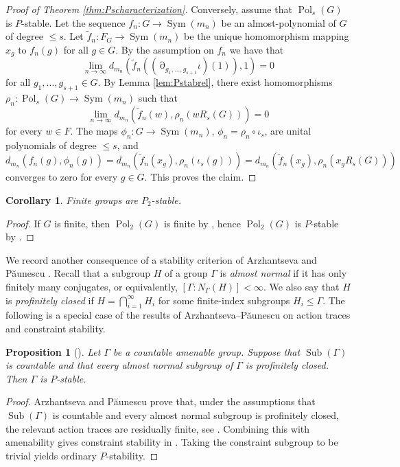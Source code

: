 \documentclass[a4paper,12pt]{amsart}
\theoremstyle{plain}
\newtheorem{corollary}[subsection]{{\bf Corollary}}
\newtheorem{proposition}[subsection]{{\bf Proposition}}
\theoremstyle{definition}
\theoremstyle{remark}
\numberwithin{equation}{subsection}
\DeclareMathOperator{\Sym}{Sym}
\DeclareMathOperator{\Sub}{Sub}
\DeclareMathOperator{\Pold}{Pol}
\DeclareMathOperator{\mypartial}{\partial}
\begin{document}
\begin{proof}[Proof of Theorem \ref{thm:Pscharacterization}]
Conversely, assume that $\Pold_s(G)$ is $P$-stable. Let the sequence $f_n:G\to\Sym(m_n)$ be an almost-polynomial of $G$ of degree $\le s$. Let $\widetilde{f}_n:F_G\to\Sym(m_n)$ be the unique homomorphism mapping $x_g$ to $f_n(g)$ for all $g\in G$. By the assumption on $f_n$ we have that
$$\lim_{n\to\infty} d_{m_n}(\widetilde{f}_n((\mypartial_{g_1,\ldots ,g_{s+1}}\iota)(1)),1)=0$$
for all $g_1,\ldots ,g_{s+1}\in G$. By Lemma \ref{lem:Pstabrel}, there exist homomorphisms $\rho_n:\Pold_s(G)\to\Sym(m_n)$ such that
$$\lim_{n\to\infty}d_{m_n}(\widetilde{f}_n(w),\rho_n(wR_s(G)))=0$$
for every $w\in F$. The maps $\phi_n:G\to\Sym(m_n)$, $\phi_n=\rho_n\circ\iota_s$, are unital polynomials of degree $\le s$, and
$$d_{m_n}(f_n(g),\phi_n(g))=d_{m_n}(\widetilde{f}_n(x_g),\rho_n(\iota_s(g)))=
d_{m_n}(\widetilde{f}_n(x_g),\rho_n(x_gR_s(G)))$$
converges to zero for every $g\in G$. This proves the claim.
\end{proof}

\begin{corollary}
    \label{cor:finiteP2}
    Finite groups are $P_2$-stable.
\end{corollary}

\begin{proof}
    If $G$ is finite, then $\Pold_2(G)$ is finite by \cite[Corollary 4.4]{JT24}, hence $\Pold_2(G)$ is $P$-stable by \cite{GR09}.
\end{proof}

We record another consequence of a stability criterion of Arzhantseva and
P\u{a}unescu \cite{AP24}. Recall that a subgroup $H$ of a group $\Gamma$ is
\emph{almost normal} if it has only finitely many conjugates, or
equivalently,
$[\Gamma:N_\Gamma(H)]<\infty$.
We also say that $H$ is \emph{profinitely closed} if
$H=\bigcap_{i=1}^{\infty} H_i$
for some finite-index subgroups $H_i\leq \Gamma$.
The following is a special case of the results of
Arzhantseva--P\u{a}unescu on action traces and constraint stability.

\begin{proposition}[\cite{AP24}]
\label{prop:AP-criterion}
Let $\Gamma$ be a countable amenable group.  Suppose that
$\Sub(\Gamma)$ is countable and that every almost normal subgroup of
$\Gamma$ is profinitely closed.  Then $\Gamma$ is $P$-stable.
\end{proposition}

\begin{proof}
Arzhantseva and P\u{a}unescu prove that, under the assumptions that
$\Sub(\Gamma)$ is countable and every almost normal subgroup is
profinitely closed, the relevant action traces are residually finite,
see \cite[Proposition 5.17]{AP24}.  Combining this with amenability
gives constraint stability in
\cite[Corollary~ 5.19]{AP24}.  Taking the constraint subgroup to be
trivial yields ordinary $P$-stability.
\end{proof}
\end{document}
